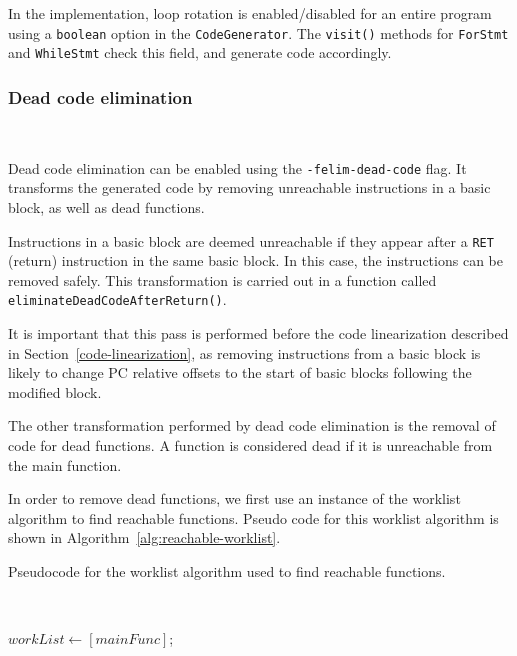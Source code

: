\documentclass[11pt,a4paper]{scrartcl}
\begin{document}
In the implementation, loop rotation is enabled/disabled for an entire program using a \verb|boolean| option in the \verb|CodeGenerator|. The \verb|visit()| methods for \verb|ForStmt| and \verb|WhileStmt| check this field, and generate code accordingly.

\subsubsection{Dead code elimination}~\label{sec:deadcode}

Dead code elimination can be enabled using the \verb|-felim-dead-code| flag. It transforms the generated code by removing unreachable instructions in a basic block, as well as dead functions.

Instructions in a basic block are deemed unreachable if they appear after a \verb|RET| (return) instruction in the same basic block. In this case, the instructions can be removed safely. This transformation is carried out in a function called \verb|eliminateDeadCodeAfterReturn()|.

It is important that this pass is performed before the code linearization described in Section~\ref{code-linearization}, as removing instructions from a basic block is likely to change PC relative offsets to the start of basic blocks following the modified block.

The other transformation performed by dead code elimination is the removal of code for dead functions. A function is considered dead if it is unreachable from the main function.

In order to remove dead functions, we first use an instance of the worklist algorithm\cite{nielson2004} to find reachable functions. Pseudo code for this worklist algorithm is shown in Algorithm~\ref{alg:reachable-worklist}.

\begin{algorithm}
   \caption{Pseudocode for the worklist algorithm used to find reachable functions.}~\label{alg:reachable-worklist}

    $workList \gets [mainFunc]$;\\
\end{algorithm}
\end{document}
